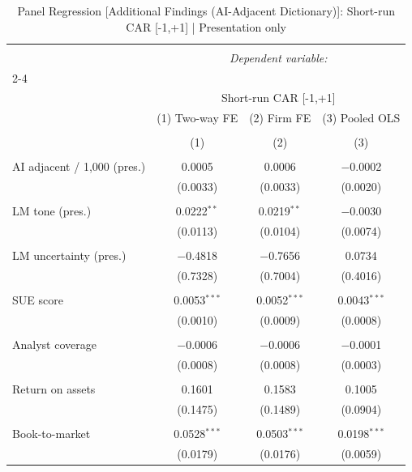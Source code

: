 
\begin{table}[!htbp] \centering 
  \caption{Panel Regression [Additional Findings (AI-Adjacent Dictionary)]: Short-run CAR [-1,+1]  |  Presentation only} 
  \label{} 
\begin{tabular}{@{\extracolsep{5pt}}lccc} 
\\[-1.8ex]\hline 
\hline \\[-1.8ex] 
 & \multicolumn{3}{c}{\textit{Dependent variable:}} \\ 
\cline{2-4} 
\\[-1.8ex] & \multicolumn{3}{c}{Short-run CAR [-1,+1]} \\ 
 & (1) Two-way FE & (2) Firm FE & (3) Pooled OLS \\ 
\\[-1.8ex] & (1) & (2) & (3)\\ 
\hline \\[-1.8ex] 
 AI adjacent / 1,000 (pres.) & 0.0005 & 0.0006 & $-$0.0002 \\ 
  & (0.0033) & (0.0033) & (0.0020) \\ 
  & & & \\ 
 LM tone (pres.) & 0.0222$^{**}$ & 0.0219$^{**}$ & $-$0.0030 \\ 
  & (0.0113) & (0.0104) & (0.0074) \\ 
  & & & \\ 
 LM uncertainty (pres.) & $-$0.4818 & $-$0.7656 & 0.0734 \\ 
  & (0.7328) & (0.7004) & (0.4016) \\ 
  & & & \\ 
 SUE score & 0.0053$^{***}$ & 0.0052$^{***}$ & 0.0043$^{***}$ \\ 
  & (0.0010) & (0.0009) & (0.0008) \\ 
  & & & \\ 
 Analyst coverage & $-$0.0006 & $-$0.0006 & $-$0.0001 \\ 
  & (0.0008) & (0.0008) & (0.0003) \\ 
  & & & \\ 
 Return on assets & 0.1601 & 0.1583 & 0.1005 \\ 
  & (0.1475) & (0.1489) & (0.0904) \\ 
  & & & \\ 
 Book-to-market & 0.0528$^{***}$ & 0.0503$^{***}$ & 0.0198$^{***}$ \\ 
  & (0.0179) & (0.0176) & (0.0059) \\ 

\end{tabular}
\end{table}
